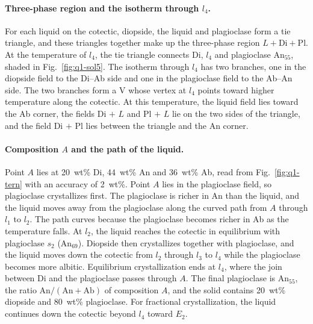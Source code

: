 \documentclass[11pt]{article}      %
\numberwithin{equation}{section}   %
\newcommand{\figref}[1]{Fig.~\ref{#1}}
\begin{document}
\paragraph{Three-phase region and the isotherm through $l_4$.}
For each liquid on the cotectic, diopside, the liquid and plagioclase form a tie triangle, and these triangles together make up the three-phase region $L + \text{Di} + \text{Pl}$.
At the temperature of $l_4$, the tie triangle connects Di, $l_4$ and plagioclase An$_{55}$, shaded in \figref{fig:q1-sol5}.
The isotherm through $l_4$ has two branches, one in the diopside field to the Di--Ab side and one in the plagioclase field to the Ab--An side.
The two branches form a V whose vertex at $l_4$ points toward higher temperature along the cotectic.
At this temperature, the liquid field lies toward the Ab corner, the fields Di $+$ $L$ and Pl $+$ $L$ lie on the two sides of the triangle, and the field Di $+$ Pl lies between the triangle and the An corner.

\paragraph{Composition $A$ and the path of the liquid.}
Point $A$ lies at 20~wt\% Di, 44~wt\% An and 36~wt\% Ab, read from \figref{fig:q1-tern} with an accuracy of 2~wt\%.
Point $A$ lies in the plagioclase field, so plagioclase crystallizes first.
The plagioclase is richer in An than the liquid, and the liquid moves away from the plagioclase along the curved path from $A$ through $l_1$ to $l_2$.
The path curves because the plagioclase becomes richer in Ab as the temperature falls.
At $l_2$, the liquid reaches the cotectic in equilibrium with plagioclase $s_2$ (An$_{69}$).
Diopside then crystallizes together with plagioclase, and the liquid moves down the cotectic from $l_2$ through $l_3$ to $l_4$ while the plagioclase becomes more albitic.
Equilibrium crystallization ends at $l_4$, where the join between Di and the plagioclase passes through $A$.
The final plagioclase is An$_{55}$, the ratio $\text{An}/(\text{An} + \text{Ab})$ of composition $A$, and the solid contains 20~wt\% diopside and 80~wt\% plagioclase.
For fractional crystallization, the liquid continues down the cotectic beyond $l_4$ toward $E_2$.
\end{document}
